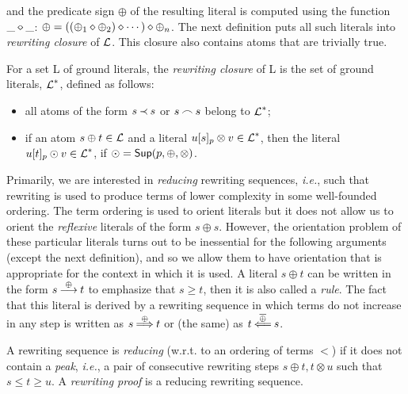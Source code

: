 and the predicate sign $\oplus$ of the resulting literal is
computed using the function \(\_\diamond\_\): \(\oplus=((\oplus _1\diamond\oplus _2)\diamond\cdots)\diamond\oplus _n\). The next 
definition puts all such literals into {\em rewriting closure} of $\mbox {$\cal L$}$. This 
closure also contains atoms that are trivially true.
\begin{DEFINITION}\label {def:rewriting-closure}
For a set \C L of ground literals, the {\em rewriting closure} of \C L is the set
of ground literals, $\mbox {$\cal L$}^\ast$, defined as follows:
\begin{itemize}\MyLPar
\item  all atoms of the form $s\mathbin{\prec} s$ or $s\mathbin{\frown} s$ belong to $\mbox {$\cal L$}^\ast$;
\item if an atom \(s\oplus t\in\mbox {$\cal L$}\) and a literal \(u[s]_p\otimes v\in\mbox {$\cal L$}^\ast\),
then the literal \(u[t]_p\odot v\in\mbox {$\cal L$}^\ast\), if 
\(\odot=\mbox {\sf Sup}(p,\oplus,\otimes)\).
\end{itemize}
\end{DEFINITION}
Primarily, we are interested in {\em reducing} rewriting sequences, {\em i.e.}, 
such that rewriting is used to produce terms of lower complexity in some 
well-founded ordering.  The term ordering is used to orient literals but it
does not allow us to orient the {\em reflexive} literals of the form $s\oplus s$.
However, the orientation problem of these particular literals
turns out to be inessential for the following arguments (except the next 
definition), and so we allow them to have orientation that is appropriate for 
the context in which it is used. A literal \(s\oplus t\) can be written in the 
form \(s\mathbin {\stackrel {\oplus}{\longrightarrow}} t\) to emphasize that $s\geq t$, then it is also called a {\em
rule}. The fact that this literal is derived by a rewriting sequence in which 
terms do not increase in any step is written as \(s \mathbin {\stackrel {\oplus}{\Longrightarrow}} t\) or (the 
same) as \(t \oTT{{\rev\oplus} \rlap{${}$}}s\).
\begin{DEFINITION} \label{def:reducing-proof}
A rewriting sequence is {\em reducing} (w.r.t. to an ordering of terms
$<$) if it does not contain a {\em peak}, {\em i.e.}, a pair of consecutive
rewriting steps \(s\oplus t,t\otimes u\) such that \(s\leq t\geq u\).
A {\em rewriting proof} is a reducing rewriting sequence.
\end{DEFINITION}
